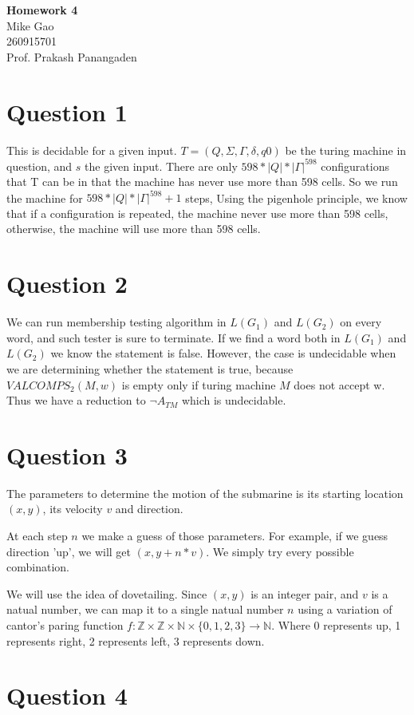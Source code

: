 \documentclass[a4paper, 11pt]{article}
\begin{document}
\noindent
\large\textbf{Homework 4} \hfill \\
\large{Mike Gao} \\
\normalsize 260915701 \\
Prof. Prakash Panangaden \hfill 


\section*{Question 1}
This is decidable for a given input. $T=(Q,\Sigma,\Gamma,\delta,q0)$ be the turing machine in question, and $s$ the given input. There are only $598*|Q|*|\Gamma|^{598}$ configurations that T can be in that the machine has never use more than 598 cells. So we run the machine for $598*|Q|*|\Gamma|^{598}+1$ steps, Using the pigenhole principle, we know that if a configuration is repeated, the machine never use more than 598 cells, otherwise, the machine will use more than 598 cells.

\section*{Question 2}
We can run membership testing algorithm in $L(G_1)$ and $L(G_2)$ on every word, and such tester is sure to terminate. If we find a word both in $L(G_1)$ and $L(G_2)$ we know the statement is false. However, the case is undecidable when we are determining whether the statement is true, because $VALCOMPS_2(M,w)$ is empty only if turing machine $M$ does not accept w. Thus we have a reduction to $\lnot A_{TM}$ which is undecidable.

\section*{Question 3}
The parameters to determine the motion of the submarine is its starting location $(x,y)$, its velocity $v$ and direction. 

At each step $n$ we make a guess of those parameters. For example, if we guess direction 'up', we will get $(x,y+n*v)$. We simply try every possible combination.

We will use the idea of dovetailing. Since $(x,y)$ is an integer pair, and $v$ is a natual number, we can map it to a single natual number $n$ using a variation of cantor's paring function $f:\mathbb {Z}\times\mathbb{Z}\times\mathbb{N}\times\{0,1,2,3\}\rightarrow\mathbb{N}$. Where 0 represents up, 1 represents right, 2 represents left, 3 represents down.

\section*{Question 4}
\end{document}
